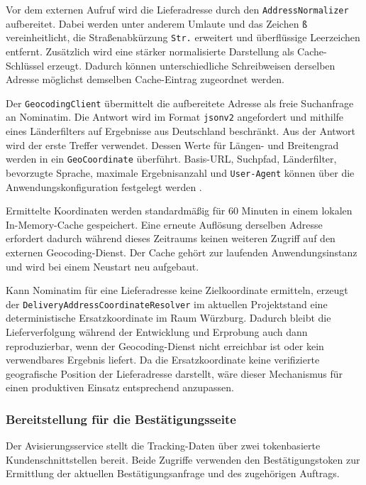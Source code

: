 Vor dem externen Aufruf wird die Lieferadresse durch den
\texttt{AddressNormalizer} aufbereitet. Dabei werden unter
anderem Umlaute und das Zeichen \texttt{ß} vereinheitlicht, die
Straßenabkürzung \texttt{Str.} erweitert und überflüssige
Leerzeichen entfernt. Zusätzlich wird eine stärker
normalisierte Darstellung als Cache-Schlüssel erzeugt. Dadurch
können unterschiedliche Schreibweisen derselben Adresse
möglichst demselben Cache-Eintrag zugeordnet werden.

Der \texttt{GeocodingClient} übermittelt die aufbereitete
Adresse als freie Suchanfrage an Nominatim. Die Antwort wird im
Format \texttt{jsonv2} angefordert und mithilfe eines
Länderfilters auf Ergebnisse aus Deutschland beschränkt. Aus
der Antwort wird der erste Treffer verwendet. Dessen Werte für
Längen- und Breitengrad werden in ein
\texttt{GeoCoordinate} überführt. Basis-URL, Suchpfad,
Länderfilter, bevorzugte Sprache, maximale Ergebnisanzahl und
\texttt{User-Agent} können über die Anwendungskonfiguration
festgelegt werden
\parencite{nominatimSearchApi}.

Ermittelte Koordinaten werden standardmäßig für 60 Minuten in
einem lokalen In-Memory-Cache gespeichert. Eine erneute
Auflösung derselben Adresse erfordert dadurch während dieses
Zeitraums keinen weiteren Zugriff auf den externen
Geocoding-Dienst. Der Cache gehört zur laufenden
Anwendungsinstanz und wird bei einem Neustart neu aufgebaut.

Kann Nominatim für eine Lieferadresse keine Zielkoordinate
ermitteln, erzeugt der
\texttt{Delivery\allowbreak{}Address\allowbreak{}Coordinate\allowbreak{}Resolver} im aktuellen
Projektstand eine deterministische Ersatzkoordinate im Raum
Würzburg. Dadurch bleibt die Lieferverfolgung während der
Entwicklung und Erprobung auch dann reproduzierbar, wenn der
Geocoding-Dienst nicht erreichbar ist oder kein verwendbares
Ergebnis liefert. Da die Ersatzkoordinate keine verifizierte
geografische Position der Lieferadresse darstellt, wäre dieser
Mechanismus für einen produktiven Einsatz entsprechend
anzupassen.

\subsubsection{Bereitstellung für die Bestätigungsseite}

Der Avisierungsservice stellt die Tracking-Daten über zwei
tokenbasierte Kundenschnittstellen bereit. Beide Zugriffe
verwenden den Bestätigungstoken zur Ermittlung der aktuellen
Bestätigungsanfrage und des zugehörigen Auftrags.

